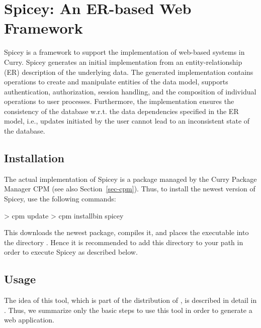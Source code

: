 \section{Spicey: An ER-based Web Framework}
\label{sec-spicey}

Spicey is a framework to support the implementation of
web-based systems in Curry. Spicey generates an initial implementation
from an entity-relationship (ER) description of the underlying
data. The generated implementation contains operations to create and
manipulate entities of the data model, supports authentication,
authorization, session handling, and the composition of individual
operations to user processes. Furthermore, the implementation ensures
the consistency of the database w.r.t. the data dependencies specified
in the ER model, i.e., updates initiated by the user cannot lead to an
inconsistent state of the database.

\subsection{Installation}

The actual implementation of Spicey is a package
managed by the Curry Package Manager CPM
(see also Section~\ref{sec-cpm}).
Thus, to install the newest version of Spicey, use the following commands:
%
\begin{curry}
> cpm update
> cpm installbin spicey
\end{curry}
%
This downloads the newest package, compiles it, and places
the executable  into the directory .
Hence it is recommended to add this directory to your path
in order to execute Spicey as described below.

\subsection{Usage}

The idea of this tool, which is part of the distribution of \CYS,
is described in detail in \cite{HanusKoschnicke14TPLP}.
Thus, we summarize only the basic steps to use this tool
in order to generate a web application.


